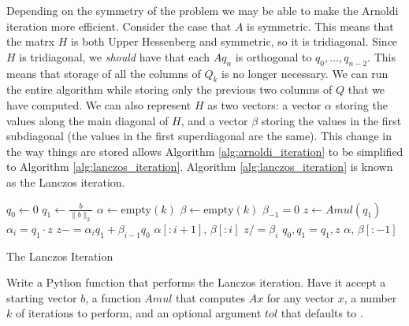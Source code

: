Depending on the symmetry of the problem we may be able to make the Arnoldi iteration more efficient.
Consider the case that $A$ is symmetric.
This means that the matrx $H$ is both Upper Hessenberg and symmetric, so it is tridiagonal.
Since $H$ is tridiagonal, we \textit{should} have that each $A q_n$ is orthogonal to $q_0, \dots, q_{n-2}$.
This means that storage of all the columns of $Q_k$ is no longer necessary.
We can run the entire algorithm while storing only the previous two columns of $Q$ that we have computed.
We can also represent $H$ as two vectors: a vector $\alpha$ storing the values along the main diagonal of $H$, and a vector $\beta$ storing the values in the first subdiagonal (the values in the first superdiagonal are the same).
This change in the way things are stored allows Algorithm \ref{alg:arnoldi_iteration} to be simplified to Algorithm \ref{alg:lanczos_iteration}.
Algorithm \ref{alg:lanczos_iteration} is known as the Lanczos iteration.

\begin{algorithm}
\begin{algorithmic}[1]
	\State $q_0 \gets 0$								
	\State $q_1 \gets \frac{b}{\|b\|_2}$
	\State $\alpha \gets \text{empty}\left(k\right)$
	\State $\beta \gets \text{empty}\left(k\right)$
	\State $\beta_{-1} = 0$
										
		\State $z \gets Amul\left(q_1\right)$					
		\State $\alpha_i = q_1 \cdot z$						
		\State $z -= \alpha_i q_1 + \beta_{i-1} q_0$				
										
			\State {} $\alpha [: i+1]$, $\beta [: i]$
		\EndIf
		\State $z /= \beta_i$
		\State $q_0, q_1 = q_1, z$						
	\EndFor
	\State {} $\alpha$, $\beta [: -1]$
\EndProcedure
\end{algorithmic}
\caption{The Lanczos Iteration}
\label{alg:lanczos_iteration}
\end{algorithm}

\begin{problem}
\label{prob:lanczos}
Write a Python function that performs the Lanczos iteration.
Have it accept a starting vector $b$, a function $Amul$ that computes $A x$ for any vector $x$, a number $k$ of iterations to perform, and an optional argument $tol$ that defaults to .
\end{problem}

